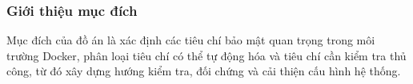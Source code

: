 \subsubsection{Giới thiệu mục đích}\label{gioi-thieu-muc-dich}

Mục đích của đồ án là xác định các tiêu chí bảo mật quan trọng trong môi trường Docker, phân loại tiêu chí có thể tự động hóa và tiêu chí cần kiểm tra thủ công, từ đó xây dựng hướng kiểm tra, đối chứng và cải thiện cấu hình hệ thống.

